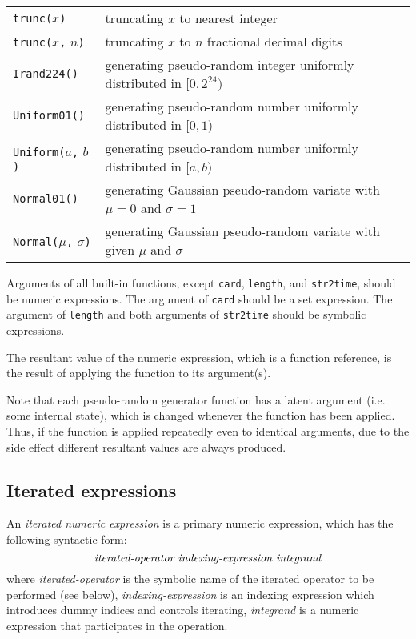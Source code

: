 \documentclass[11pt]{report}
\begin{document}
\begin{tabular}{@{}p{112pt}p{328pt}@{}}
{\tt trunc(}$x${\tt)}&truncating $x$ to nearest integer\\
{\tt trunc(}$x${\tt,} $n${\tt)}&truncating $x$ to $n$ fractional
decimal digits\\
{\tt Irand224()}&generating pseudo-random integer uniformly distributed
in $[0,2^{24})$\\
{\tt Uniform01()}&generating pseudo-random number uniformly distributed
in $[0,1)$\\
{\tt Uniform(}$a${\tt,} $b${\tt)}&generating pseudo-random number
uniformly distributed in $[a,b)$\\
{\tt Normal01()}&generating Gaussian pseudo-random variate with
$\mu=0$ and $\sigma=1$\\
{\tt Normal(}$\mu${\tt,} $\sigma${\tt)}&generating Gaussian
pseudo-random variate with given $\mu$ and $\sigma$\\
\end{tabular}

Arguments of all built-in functions, except {\tt card}, {\tt length},
and {\tt str2time}, should be numeric expressions. The argument of
{\tt card} should be a set expression. The argument of {\tt length} and
both arguments of {\tt str2time} should be symbolic expressions.

The resultant value of the numeric expression, which is a function
reference, is the result of applying the function to its argument(s).

Note that each pseudo-random generator function has a latent argument
(i.e. some internal state), which is changed whenever the function has
been applied. Thus, if the function is applied repeatedly even to
identical arguments, due to the side effect different resultant values
are always produced.

\newpage

\subsection{Iterated expressions}
\label{itexpr}

An {\it iterated numeric expression} is a primary numeric expression,
which has the following syntactic form:
$$\mbox{\it iterated-operator indexing-expression integrand}$$
where {\it iterated-operator} is the symbolic name of the iterated
operator to be performed (see below), {\it indexing-expression} is an
indexing expression which introduces dummy indices and controls
iterating, {\it integrand} is a numeric expression that participates in
the operation.
\end{document}
